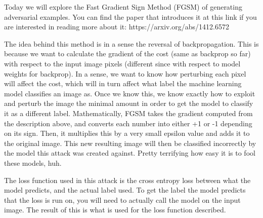 \documentclass[11pt]{article}
\begin{document}
    Today we will explore the Fast Gradient Sign Method (FGSM) of generating
adversarial examples. You can find the paper that introduces it at this
link if you are interested in reading more about it:
https://arxiv.org/abs/1412.6572

The idea behind this method is in a sense the reversal of
backpropagation. This is because we want to calculate the gradient of
the cost (same as backprop so far) with respect to the input image
pixels (different since with respect to model weights for backprop). In
a sense, we want to know how perturbing each pixel will affect the cost,
which will in turn affect what label the machine learning model
classifies an image as. Once we know this, we know exactly how to
exploit and perturb the image the minimal amount in order to get the
model to classify it as a different label. Mathematically, FGSM takes
the gradient computed from the description above, and converts each
number into either +1 or -1 depending on its sign. Then, it multiplies
this by a very small epsilon value and adds it to the original image.
This new resulting image will then be classified incorrectly by the
model this attack was created against. Pretty terrifying how easy it is
to fool these models, huh.

The loss function used in this attack is the cross entropy loss between
what the model predicts, and the actual label used. To get the label the
model predicts that the loss is run on, you will need to actually call
the model on the input image. The result of this is what is used for the
loss function described.
\end{document}
